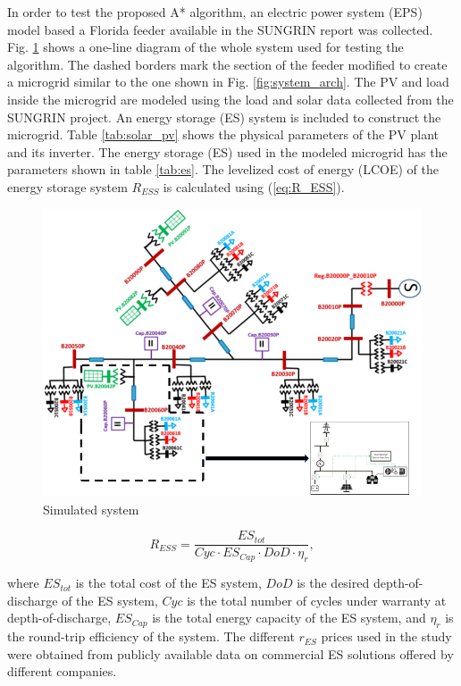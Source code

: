 In order to test the proposed A* algorithm, an electric power system (EPS) model based a Florida feeder available in the SUNGRIN report \cite{SUNGRIN} was collected. Fig. \ref{fig:simulation_grid} shows a one-line diagram of the whole system used for testing the algorithm. The dashed borders mark the section of the feeder modified to create a microgrid similar to the one shown in Fig. \ref{fig:system_arch}. The PV and load inside the microgrid are modeled using the load and solar data collected from the SUNGRIN project. An energy storage (ES) system is included to construct the microgrid. Table \ref{tab:solar_pv} shows the physical parameters of the PV plant and its inverter. The energy storage (ES) used in the modeled microgrid has the parameters shown in table \ref{tab:es}. The levelized cost of energy (LCOE)  of the energy storage system $R_{ESS}$ is calculated using (\ref{eq:R_ESS}).

\begin{figure}[!ht]
    \centering
    \includegraphics[width = 0.8\linewidth]{figs/simulation_grid.png}
    \caption{Simulated system}
    \label{fig:simulation_grid}
\end{figure}


\begin{equation}
\label{eq:R_ESS}
R_{ESS} = \dfrac{ES_{tot}}{Cyc\cdot ES_{Cap}\cdot DoD\cdot \eta_{r}},
\end{equation}

where $ES_{tot}$ is the total cost of the ES system, $DoD$ is the desired depth-of-discharge of the ES system, $Cyc$ is the total number of cycles under warranty at depth-of-discharge, $ES_{Cap}$ is the total energy capacity of the ES system, and $\eta_r$ is the round-trip efficiency of the system. The different $r_{ES}$ prices used in the study were obtained from publicly available data on commercial ES solutions offered by different companies. 

